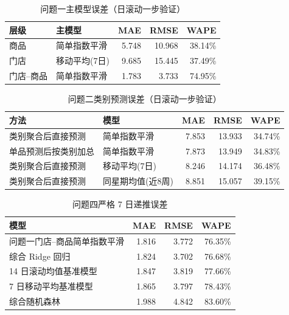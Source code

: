 \begin{table}[H]
\centering
\caption{问题一主模型误差（日滚动一步验证）}
\begin{tabular}{llrrr}
\toprule
层级 & 主模型 & MAE & RMSE & WAPE \\
\midrule
商品 & 简单指数平滑 & 5.748 & 10.968 & 38.14\% \\
门店 & 移动平均(7日) & 9.685 & 15.445 & 37.49\% \\
门店--商品 & 简单指数平滑 & 1.783 & 3.733 & 74.95\% \\
\bottomrule
\end{tabular}
\end{table}

\begin{table}[H]
\centering
\caption{问题二类别预测误差（日滚动一步验证）}
\begin{tabular}{llrrr}
\toprule
方法 & 模型 & MAE & RMSE & WAPE \\
\midrule
类别聚合后直接预测 & 简单指数平滑 & 7.853 & 13.933 & 34.74\% \\
单品预测后按类别加总 & 简单指数平滑 & 7.873 & 13.949 & 34.83\% \\
类别聚合后直接预测 & 移动平均(7日) & 8.246 & 14.174 & 36.48\% \\
类别聚合后直接预测 & 同星期均值(近8周) & 8.851 & 15.057 & 39.15\% \\
\bottomrule
\end{tabular}
\end{table}

\begin{table}[H]
\centering
\caption{问题四严格 7 日递推误差}
\begin{tabular}{lrrr}
\toprule
模型 & MAE & RMSE & WAPE \\
\midrule
问题一门店--商品简单指数平滑 & 1.816 & 3.772 & 76.35\% \\
综合 Ridge 回归 & 1.824 & 3.702 & 76.68\% \\
14 日滚动均值基准模型 & 1.847 & 3.819 & 77.66\% \\
7 日移动平均基准模型 & 1.865 & 3.797 & 78.43\% \\
综合随机森林 & 1.988 & 4.842 & 83.60\% \\
\bottomrule
\end{tabular}
\end{table}

